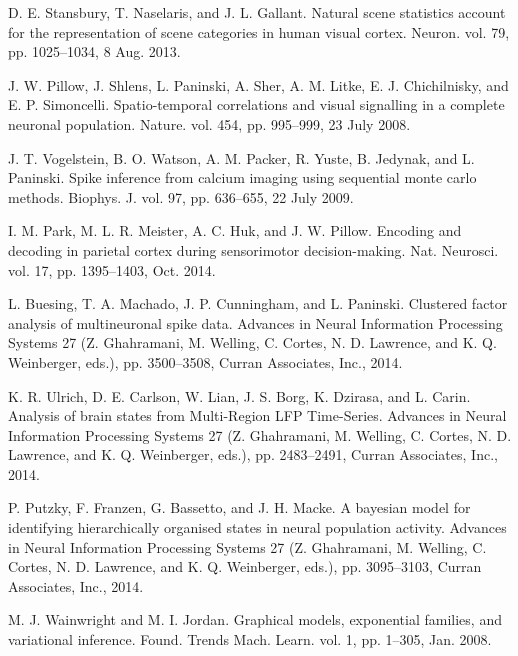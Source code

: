 \documentclass[10pt,letterpaper]{article}
\begin{document}
\begin{thebibliography}{10}
D. E. Stansbury, T. Naselaris, and J. L. Gallant.
\newblock Natural scene statistics account for the representation of scene categories in human visual cortex.
\newblock Neuron. vol. 79, pp. 1025--1034, 8 Aug. 2013.

J. W. Pillow, J. Shlens, L. Paninski, A. Sher, A. M. Litke, E. J. Chichilnisky, and E. P. Simoncelli.
\newblock Spatio-temporal correlations and visual signalling in a complete neuronal population.
\newblock Nature. vol. 454, pp. 995--999, 23 July 2008.

J. T. Vogelstein, B. O. Watson, A. M. Packer, R. Yuste, B. Jedynak, and L. Paninski.
\newblock Spike inference from calcium imaging using sequential monte carlo methods.
\newblock Biophys. J. vol. 97, pp. 636--655, 22 July 2009.

I. M. Park, M. L. R. Meister, A. C. Huk, and J. W. Pillow.
\newblock Encoding and decoding in parietal cortex during sensorimotor decision-making.
\newblock Nat. Neurosci. vol. 17, pp. 1395--1403, Oct. 2014.

L. Buesing, T. A. Machado, J. P. Cunningham, and L. Paninski.
\newblock Clustered factor analysis of multineuronal spike data.
\newblock Advances in Neural Information Processing Systems 27 (Z. Ghahramani, M. Welling, C. Cortes, N. D. Lawrence, and K. Q. Weinberger, eds.), pp. 3500--3508, Curran Associates, Inc., 2014.

K. R. Ulrich, D. E. Carlson, W. Lian, J. S. Borg, K. Dzirasa, and L. Carin.
\newblock Analysis of brain states from {Multi-Region} {LFP} {Time-Series}.
\newblock Advances in Neural Information Processing Systems 27 (Z. Ghahramani, M. Welling, C. Cortes, N. D. Lawrence, and K. Q. Weinberger, eds.), pp. 2483--2491, Curran Associates, Inc., 2014.

P. Putzky, F. Franzen, G. Bassetto, and J. H. Macke.
\newblock A bayesian model for identifying hierarchically organised states in neural population activity.
\newblock Advances in Neural Information Processing Systems 27 (Z. Ghahramani, M. Welling, C. Cortes, N. D. Lawrence, and K. Q. Weinberger, eds.), pp. 3095--3103, Curran Associates, Inc., 2014.

M. J. Wainwright and M. I. Jordan.
\newblock Graphical models, exponential families, and variational inference.
\newblock Found. Trends Mach. Learn. vol. 1, pp. 1--305, Jan. 2008.


\end{thebibliography}
\end{document}
